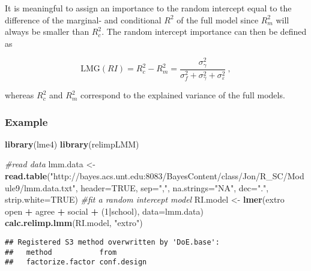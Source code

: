 \documentclass[
]{article}
\newenvironment{Shaded}{\begin{snugshade}}{\end{snugshade}}
\newcommand{\CommentTok}[1]{\textcolor[rgb]{0.56,0.35,0.01}{\textit{#1}}}
\newcommand{\DataTypeTok}[1]{\textcolor[rgb]{0.13,0.29,0.53}{#1}}
\newcommand{\DecValTok}[1]{\textcolor[rgb]{0.00,0.00,0.81}{#1}}
\newcommand{\KeywordTok}[1]{\textcolor[rgb]{0.13,0.29,0.53}{\textbf{#1}}}
\newcommand{\NormalTok}[1]{#1}
\newcommand{\OperatorTok}[1]{\textcolor[rgb]{0.81,0.36,0.00}{\textbf{#1}}}
\newcommand{\OtherTok}[1]{\textcolor[rgb]{0.56,0.35,0.01}{#1}}
\newcommand{\StringTok}[1]{\textcolor[rgb]{0.31,0.60,0.02}{#1}}
\begin{document}
It is meaningful to assign an importance to the random intercept equal
to the difference of the marginal- and conditional \(R^2\) of the full
model since \(R^2_m\) will always be smaller than \(R^2_c\). The random
intercept importance can then be defined as

\begin{equation}
    \textrm{LMG}(RI) = R_c^2- R_m^2  = \frac{\sigma_\gamma^2}{\sigma_f^2 +\sigma_\gamma^2 + \sigma_\varepsilon^2} \ ,
    \label{person_importance_R2}
\end{equation}

whereas \(R^2_c\) and \(R^2_m\) correspond to the explained variance of
the full models.

\hypertarget{example-1}{%
\subsubsection{Example}\label{example-1}}

\begin{Shaded}
\begin{Highlighting}[]
\KeywordTok{library}\NormalTok{(lme4)}
\KeywordTok{library}\NormalTok{(relimpLMM)}
\end{Highlighting}
\end{Shaded}

\begin{Shaded}
\begin{Highlighting}[]
\CommentTok{#read data}
\NormalTok{lmm.data <-}\StringTok{ }\KeywordTok{read.table}\NormalTok{(}\StringTok{"http://bayes.acs.unt.edu:8083/BayesContent/class/Jon/R_SC/Module9/lmm.data.txt"}\NormalTok{,}
                       \DataTypeTok{header=}\OtherTok{TRUE}\NormalTok{, }\DataTypeTok{sep=}\StringTok{","}\NormalTok{, }\DataTypeTok{na.strings=}\StringTok{"NA"}\NormalTok{, }\DataTypeTok{dec=}\StringTok{"."}\NormalTok{, }\DataTypeTok{strip.white=}\OtherTok{TRUE}\NormalTok{)}
\CommentTok{#fit a random intercept model}
\NormalTok{RI.model <-}\StringTok{ }\KeywordTok{lmer}\NormalTok{(extro }\OperatorTok{~}\StringTok{ }\NormalTok{open }\OperatorTok{+}\StringTok{ }\NormalTok{agree }\OperatorTok{+}\StringTok{ }\NormalTok{social }\OperatorTok{+}\StringTok{ }\NormalTok{(}\DecValTok{1}\OperatorTok{|}\NormalTok{school), }\DataTypeTok{data=}\NormalTok{lmm.data)}
\KeywordTok{calc.relimp.lmm}\NormalTok{(RI.model, }\StringTok{"extro"}\NormalTok{)}
\end{Highlighting}
\end{Shaded}

\begin{verbatim}
## Registered S3 method overwritten by 'DoE.base':
##   method           from       
##   factorize.factor conf.design
\end{verbatim}
\end{document}
